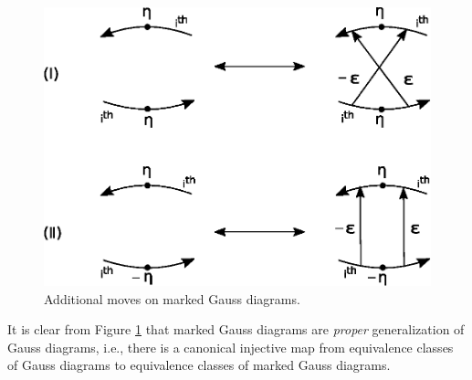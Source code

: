 \documentclass[11 pt, reqno]{amsart}
\theoremstyle{definition}
\numberwithin{equation}{subsection}
\begin{document}
\begin{figure}[H]
\includegraphics{GRmoves.eps}
\caption{Additional moves on marked Gauss diagrams.}
\label{F: AddGaussMoves}
\end{figure}


It is clear from Figure \ref{F: AddGaussMoves} that marked Gauss diagrams are {\it proper} generalization of Gauss diagrams, i.e., there is a canonical injective map from equivalence classes of Gauss diagrams to equivalence classes of marked Gauss diagrams.
\par
\end{document}
